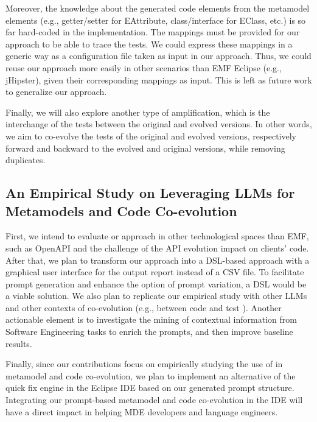 Moreover, the knowledge about the generated code elements from the metamodel elements (e.g., getter/setter for EAttribute, class/interface for EClass, etc.) is so far hard-coded in the implementation. The mappings must be provided for our approach to be able to trace the tests. We could express these mappings in a generic way as a configuration file taken as input in our approach. Thus, we could reuse our approach more easily in other scenarios than EMF Eclipse (e.g., jHipster), given their corresponding mappings as input. This is left as future work to generalize our approach.

Finally, we will also explore another type of amplification, which is the interchange of the tests between the original and evolved versions. In other words, we aim to co-evolve the tests of the original and evolved versions, respectively forward and backward to the evolved and original versions, while removing duplicates. 




\subsection{An Empirical Study on Leveraging LLMs for Metamodels and Code Co-evolution}


First, we intend to evaluate or approach in other technological spaces than EMF, such as OpenAPI and the challenge of the API evolution impact on clients' code. After that, we plan to transform our approach into a DSL-based approach with a graphical user interface for the output report instead of a CSV file. To facilitate prompt generation and enhance the option of prompt variation, a DSL would be a viable solution. We also plan to replicate our empirical study with other LLMs and other contexts of co-evolution (e.g., between code and test \cite{le2021untangling}).  Another actionable element is to investigate the mining of contextual information from Software Engineering tasks to enrich the prompts, and then improve baseline results.

Finally, since our contributions focus on empirically studying the use of \LLM in metamodel and code co-evolution, we plan to implement an alternative of the quick fix engine in the Eclipse IDE based on our generated prompt structure. Integrating our prompt-based metamodel and code co-evolution in the IDE will have a direct impact in helping MDE developers and language engineers. 
